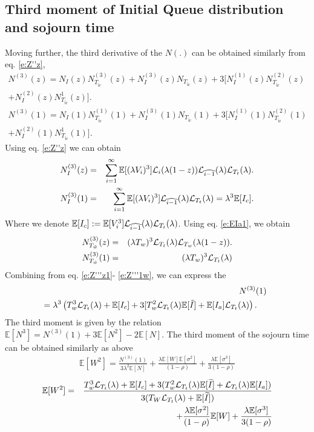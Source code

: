 \documentclass[journal]{IEEEtran}
\newcommand {\bear} {\begin{eqnarray}}
\newcommand {\eear} {\end{eqnarray}}
\def \E{{\mathbb E}}
\begin{document}
\subsection{Third moment of Initial Queue distribution and sojourn time}
Moving further, the third derivative of the $N(.)$ can be obtained similarly from eq.
\eqref{e:Z''z},
\bear
\label{e:Z'''z}
N^{(3)}(z)= N_I(z)N^{(3)}_{T_{\tilde{w}}}(z) + N^{(3)}_I(z)N_{T_{\tilde{w}}}(z) + 3[ N^{(1)}_I(z) N^{(2)}_{T_{\tilde{w}}}(z)&&\nonumber\\
+N^{(2)}_I(z) N^{1}_{T_{\tilde{w}}}(z)] .&&\\
N^{(3)}(1)= N_I(1)N^{(1)}_{T_{\tilde{w}}}(1) + N^{(3)}_I(1)N_{T_{\tilde{w}}}(1) + 3[ N^{(1)}_I(1) N^{(2)}_{T_{\tilde{w}}}(1)&&\nonumber\\+N^{(2)}_I(1) N^{1}_{T_{\tilde{w}}}(1)] .&&
\eear
Using eq. \eqref{e:Z''z} we can obtain
\bear
\label{e:Z'''z1}
N^{(3)}_I(z)&=&\sum_{i=1}^{\infty} \E[(\lambda V_i)^3]{\cal L}_{i}(\lambda(1-z)){\cal L}_{\widehat{i-1}}(\lambda){\cal L}_{T_t}(\lambda) .\\
\label{e:Z'''1}
N^{(3)}_I(1)&=&\sum_{i=1}^{\infty} \E[(\lambda V_i)^3] {\cal L}_{\widehat{i-1}}(\lambda){\cal L}_{T_t}(\lambda)=\lambda^3\E[I_c].
\eear
Where we denote $\E[I_c]:=\E[V_i^3] {\cal L}_{\widehat{i-1}}(\lambda){\cal L}_{T_t}(\lambda)$.
Using eq. \eqref{e:EIa1}, we obtain
\bear
\label{e:Z'''zw}
N^{(3)}_{T_{\tilde{w}}}(z)&=& (\lambda T_w)^3 {\cal L}_{T_t}(\lambda) {\cal L}_{T_w}(\lambda(1-z)).\\
\label{e:Z'''1w}
N^{(3)}_{T_{\tilde{w}}}(1)&=& (\lambda T_w)^3 {\cal L}_{T_t}(\lambda)
\eear
Combining from eq. \eqref{e:Z'''z1}- \eqref{e:Z'''1w}, we can express the
\bear
\label{e:Z'''1f}
&&\hspace{-8mm}N^{(3)}(1)\nonumber\\
&&\hspace{-5mm}= \lambda^3\left( T_w^3 {\cal L}_{T_t}(\lambda)+\E[I_c] +3[ T_w^2 {\cal L}_{T_t}(\lambda)\E[\tilde{I}]+\E[I_a]{\cal L}_{T_t}(\lambda)\right).\hspace{4mm}
\eear
\noindent The third moment is given by the relation $\E[N^3]=N^{(3)}(1)+3\E[N^2]-2\E[N]$.
The third moment of the sojourn time can be obtained similarly as above
\bear
\E[W^2]=\frac{N^{(3)}(1)}{3\lambda^2\E[N]}+\frac{\lambda \E[W] \E[\sigma^{2}]}{(1-\rho)} +\frac{\lambda \E[\sigma^{3}]}{3(1-\rho)} \eear
\bear
\nonumber \E[W^2]&=&\frac{ T_w^3 {\cal L}_{T_t}(\lambda)+\E[I_c]+3 (T_w^2{\cal L}_{T_t}(\lambda)\E[\widetilde{I}] +{\cal L}_{T_t}(\lambda) \E[I_a])}{3(T_W{\cal L}_{T_t}(\lambda)+\E[\widetilde{I}])}\\&&+
\frac{\lambda \E[\sigma^{2}]}{(1-\rho)}\E[W] +\frac{\lambda \E[\sigma^{3}]}{3(1-\rho)}
\eear
\end{document}

